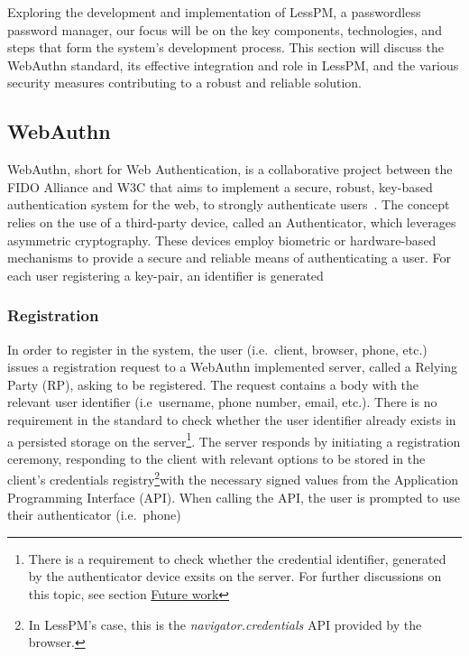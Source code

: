 Exploring the development and implementation of LessPM, a passwordless password manager, our focus will be on the key
components, technologies, and steps that form the system's development process.
This section will discuss the WebAuthn standard, its effective integration and role in LessPM, and the various security
measures contributing to a robust and reliable solution.



\newcommand{\credIdentifier}{\footnote{There is a requirement to check whether the credential identifier, generated by the authenticator
device exsits on the server.
For further discussions on this topic, see section \hyperref[sec:futurework]{Future work}}}

\newcommand{\navigatorApi}{\footnote{In LessPM's case, this is the \textit{navigator.credentials} API provided by the browser.}}

\subsection*{WebAuthn}
WebAuthn, short for Web Authentication, is a collaborative project between the FIDO Alliance and W3C that aims to
implement a secure, robust, key-based authentication system for the web, to strongly authenticate users~\cite{webauthn_level_2}.
The concept relies on the use of a third-party device, called an Authenticator, which leverages asymmetric cryptography.
These devices employ biometric or hardware-based mechanisms to provide a secure and reliable means of authenticating a
user.
For each user registering a key-pair, an identifier is generated~\cite{webauthn_credential_id,webauthn_public_key_credential}

\subsubsection*{Registration}
In order to register in the system, the user (i.e.\ client, browser, phone, etc.) issues a
registration request to a WebAuthn implemented server, called a Relying Party (RP), asking to be registered.
The request contains a body with the relevant user identifier (i.e\ username, phone number, email, etc.).
There is no requirement in the standard to check whether the user identifier already exists in a persisted storage on
the server\credIdentifier.
The server responds by initiating a registration ceremony, responding to the client with relevant options to be stored
in the client's credentials registry\navigatorApi with the necessary signed values from the Application Programming
Interface (API). When calling the API, the user is prompted to use their authenticator (i.e.\ phone)




